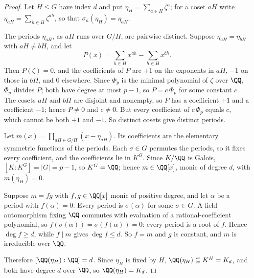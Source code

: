 \documentclass[11pt]{article}
\begin{document}
\begin{proof}
Let $H\le G$ have index $d$ and put $\eta_H=\sum_{a\in H}\zeta^{a}$; for a coset $aH$ write $\eta_{aH}=\sum_{h\in H}\zeta^{ah}$, so that $\sigma_a(\eta_H)=\eta_{aH}$.

The periods $\eta_{aH}$, as $aH$ runs over $G/H$, are pairwise distinct. Suppose $\eta_{aH}=\eta_{bH}$ with $aH\ne bH$, and let
\[ P(x)=\sum_{h\in H}x^{ah}-\sum_{h\in H}x^{bh}. \]
Then $P(\zeta)=0$, and the coefficients of $P$ are $+1$ on the exponents in $aH$, $-1$ on those in $bH$, and $0$ elsewhere. Since $\Phi_p$ is the minimal polynomial of $\zeta$ over $\QQ$, $\Phi_p$ divides $P$; both have degree at most $p-1$, so $P=c\,\Phi_p$ for some constant $c$. The cosets $aH$ and $bH$ are disjoint and nonempty, so $P$ has a coefficient $+1$ and a coefficient $-1$; hence $P\ne0$ and $c\ne0$. But every coefficient of $c\,\Phi_p$ equals $c$, which cannot be both $+1$ and $-1$. So distinct cosets give distinct periods.

Let $m(x)=\prod_{aH\in G/H}(x-\eta_{aH})$. Its coefficients are the elementary symmetric functions of the periods. Each $\sigma\in G$ permutes the periods, so it fixes every coefficient, and the coefficients lie in $K^{G}$. Since $K/\QQ$ is Galois, $[K:K^{G}]=|G|=p-1$, so $K^{G}=\QQ$; hence $m\in\QQ[x]$, monic of degree $d$, with $m(\eta_H)=0$.

Suppose $m=fg$ with $f,g\in\QQ[x]$ monic of positive degree, and let $\alpha$ be a period with $f(\alpha)=0$. Every period is $\sigma(\alpha)$ for some $\sigma\in G$. A field automorphism fixing $\QQ$ commutes with evaluation of a rational-coefficient polynomial, so $f(\sigma(\alpha))=\sigma(f(\alpha))=0$: every period is a root of $f$. Hence $\deg f\ge d$, while $f\mid m$ gives $\deg f\le d$. So $f=m$ and $g$ is constant, and $m$ is irreducible over $\QQ$.

Therefore $[\QQ(\eta_H):\QQ]=d$. Since $\eta_H$ is fixed by $H$, $\QQ(\eta_H)\subseteq K^{H}=K_d$, and both have degree $d$ over $\QQ$, so $\QQ(\eta_H)=K_d$.
\end{proof}
\end{document}
